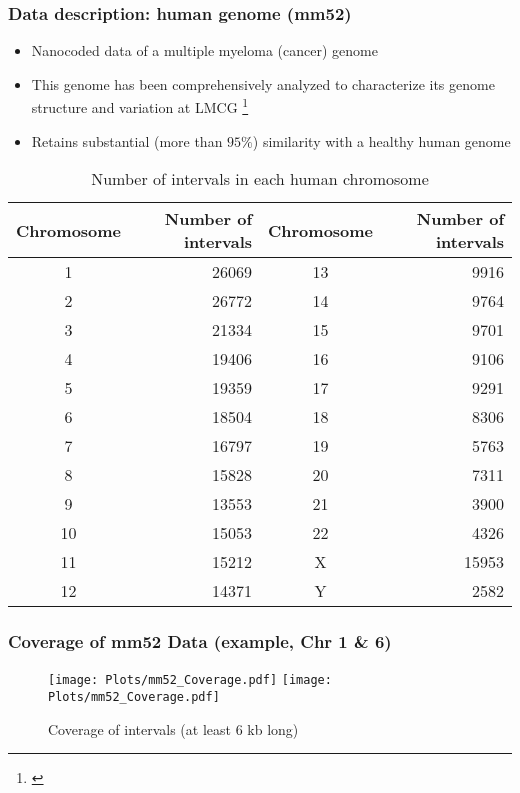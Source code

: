 \documentclass[10pt,dvipsnames,table]{beamer}
\begin{document}
\begin{frame}
\frametitle{Data description: human genome (mm52)}
\begin{itemize}
\footnotesize
\item Nanocoded data of a multiple myeloma (cancer) genome
\item This genome has been comprehensively analyzed to characterize its genome structure and variation at LMCG \footnote{\cite{Gupta_etal_2015_PNAS}}
\item Retains substantial (more than $95\%$) similarity with a healthy human genome
\end{itemize}

\begin{table}[H]
\footnotesize
\centering
\begin{tabular}{c | r || c | r}
  \hline
  \hline
  Chromosome & Number of intervals & Chromosome & Number of intervals \\ 
  \hline
  1 & 26069  & 13 & 9916 \\
  2 & 26772  & 14 & 9764 \\
  3 & 21334  & 15 & 9701 \\
  4 & 19406  & 16 & 9106 \\
  5 & 19359  & 17 & 9291 \\
  6 & 18504  & 18 & 8306 \\
  7 & 16797  & 19 & 5763 \\
  8 & 15828  & 20 & 7311 \\
  9 & 13553  & 21 & 3900 \\
  10 & 15053  & 22 & 4326 \\
  11 & 15212  & X & 15953 \\
  12 & 14371  & Y & 2582 \\
  \hline
  \hline
\end{tabular}
\caption{Number of intervals in each human chromosome}
\label{tab:mm52intervals}
\end{table}

\end{frame}

\begin{frame}
\frametitle{Coverage of mm52 Data (example, Chr 1 \& 6)}
\begin{figure}[H]
\begin{center}
\texttt{[image: Plots/mm52\_Coverage.pdf]}
\texttt{[image: Plots/mm52\_Coverage.pdf]}
\end{center}
\caption{Coverage of intervals (at least 6 kb long)}
\label{fig:Coverage_mm1}
\end{figure}

\end{frame}
\end{document}
